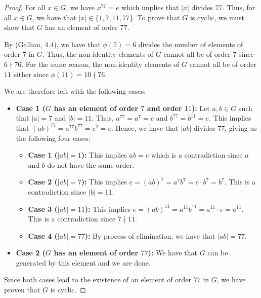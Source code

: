 \documentclass[12pt,reqno]{article}
\theoremstyle{plain}
\theoremstyle{definition}
\begin{document}
\begin{proof}
    For all \(x\in G\), we have \(x^{77}=e\) which implies that \(|x|\) divides \(77\). Thus, 
    for all \(x\in G\), we have that \(|x|\in\{1,7,11,77\}\). To prove that \(G\) is cyclic, we must show that 
    \(G\) has an element of order \(77\).

    By (Gallian, 4.4), we have that \(\phi(7)=6\) divides the number of elements of order \(7\) in \(G\). Thus,
    the non-identity elements of \(G\) cannot all be of order \(7\) since \(6\nmid 76\). For the same reason,
    the non-identity elements of \(G\) cannot all be of order \(11\) either since \(\phi(11)=10\nmid 76\).
    
    We are therefore left with the following cases:
    \begin{itemize}
        \item \textbf{Case 1 (\(G\) has an element of order \(7\) and order \(11\)):} Let \(a,b\in G\) such that
        \(|a|=7\) and \(|b|=11\). Thus, \(a^{77}=a^7=e\) and \(b^{77}=b^{11}=e\). This implies that
        \((ab)^{77}=a^{77}b^{77}=e^2=e\). Hence, we have that \(|ab|\) divides \(77\), giving us the following four cases:
        
        \begin{itemize}
            \item \textbf{Case 1 (\(|ab|=1\)):} This implies \(ab=e\) which is a contradiction since \(a\) and \(b\) do not have the same order.
            \item \textbf{Case 2 (\(|ab|=7\)):} This implies \(e=(ab)^7=a^7b^7=e\cdot b^7=b^7\). This is a contradiction since \(|b|=11\).
            \item \textbf{Case 3 (\(|ab|=11\)):} This implies \(e=(ab)^{11}=a^{11}b^{11}=a^{11}\cdot e=a^{11}\). This is a contradiction since \(7\nmid 11\).
            \item \textbf{Case 4 (\(|ab|=77\)):} By process of elimination, we have that \(|ab|=77\).
        \end{itemize}


        \item \textbf{Case 2 (\(G\) has an element of order \(77\)):} We have that \(G\) can be generated
        by this element and we are done.
    \end{itemize}
    Since both cases lead to the existence of an element of order \(77\) in \(G\), we have
    proven that \(G\) is cyclic.
\end{proof}

\newpage
\end{document}
